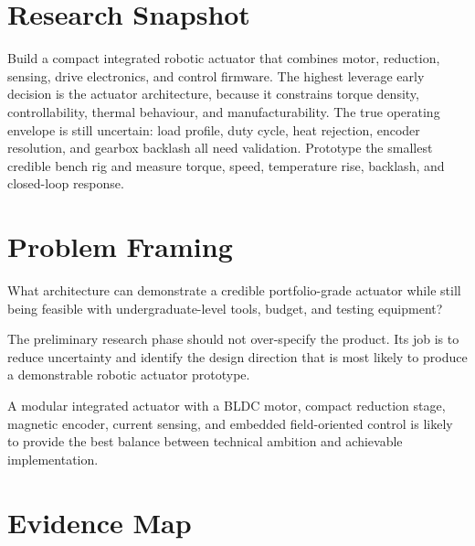 \documentclass[internal]{nervtech-research}
\begin{document}
\maketitle
\tableofcontents
\newpage

\section{Research Snapshot}

\researchsnapshot
  {Build a compact integrated robotic actuator that combines motor, reduction, sensing, drive electronics, and control firmware.}
  {The highest leverage early decision is the actuator architecture, because it constrains torque density, controllability, thermal behaviour, and manufacturability.}
  {The true operating envelope is still uncertain: load profile, duty cycle, heat rejection, encoder resolution, and gearbox backlash all need validation.}
  {Prototype the smallest credible bench rig and measure torque, speed, temperature rise, backlash, and closed-loop response.}

\section{Problem Framing}

\begin{researchquestion}
What architecture can demonstrate a credible portfolio-grade actuator while still being feasible with undergraduate-level tools, budget, and testing equipment?
\end{researchquestion}

The preliminary research phase should not over-specify the product. Its job is to reduce uncertainty and identify the design direction that is most likely to produce a demonstrable robotic actuator prototype.

\begin{hypothesisbox}[Architecture]
A modular integrated actuator with a BLDC motor, compact reduction stage, magnetic encoder, current sensing, and embedded field-oriented control is likely to provide the best balance between technical ambition and achievable implementation.
\end{hypothesisbox}

\section{Evidence Map}

\begin{evidencetable}
\end{evidencetable}
\end{document}
